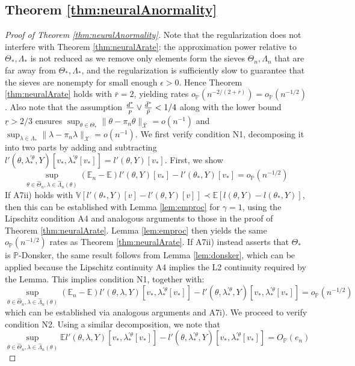 \documentclass[12pt]{article}
\theoremstyle{myplain}
\theoremstyle{definition}
\theoremstyle{definition}
\theoremstyle{remark}
\numberwithin{equation}{section}
\begin{document}
\subsection{Theorem \ref{thm:neuralAnormality}}
\begin{proof}[Proof of Theorem \ref{thm:neuralAnormality}]
Note that the regularization does not interfere with Theorem \ref{thm:neuralArate}: the approximation power relative to $\Theta_*, \Lambda_*$ is not reduced as we remove only elements form the sieves $\Theta_n, \Lambda_n$ that are far away from $\Theta_*, \Lambda_*$, and the regularization is sufficiently slow to guarantee that the sieves are nonempty for small enough $\epsilon>0$. Hence Theorem \ref{thm:neuralArate} holds with $\bar{r}=2$, yielding rates $o_\mathbb{P}(n^{-2/(2+\bar{r})})=o_\mathbb{P}(n^{-1/2})$. Also note that the assumption $\frac{d^*}{p}\vee\frac{\Bar{d}^*}{\Bar{p}}<1/4$ along with the lower bound $ \underline{r}>2/3$ ensures $\sup_{\theta\in\Theta_*}\|\theta-\pi_n\theta\|_{\bar{{\mathcal{X}}}}=o(n^{-1})$ and $\sup_{\lambda\in\Lambda_*}\|\lambda-\pi_n\lambda\|_{{\mathcal{X}}}=o(n^{-1})$. We first verify condition N1, decomposing it into two parts by adding and subtracting $l'(\theta,\lambda_*^{\prime\theta}, Y)[v_*,\lambda_*^{\prime\theta}[v_*]]=l'(\theta, Y)[v_*]$. First, we show
$$
\sup_{\theta\in\widehat{\Theta}_n,\lambda\in\widehat{\Lambda}_n(\theta)} (\mathbb{E}_n-\mathbb{E}) l'(\theta, Y)[v_*] - l'(\theta_*, Y)[v_*]  = o_\mathbb{P}(n^{-1/2})
$$
If A7ii) holds with $\mathbb{V}[l'(\theta_*, Y)[v] - l'(\theta, Y)[v]] \prec \mathbb{E}[l(\theta, Y)-l(\theta_*, Y)]$, then this can be established with Lemma \ref{lem:emproc} for $\gamma=1$, using the Lipschitz condition A4 and analogous arguments to those in the proof of Theorem \ref{thm:neuralArate}. Lemma \ref{lem:emproc} then yields the same $o_\mathbb{P}(n^{-1/2})$ rates as Theorem \ref{thm:neuralArate}. If A7ii) instead asserts that $\Theta_*$ is $\mathbb{P}$-Donsker, the same result follows from Lemma \ref{lem:donsker}, which can be applied because the Lipschitz continuity A4 implies the L2 continuity required by the Lemma. This implies condition N1, together with: 
$$
\sup_{\theta\in\widehat{\Theta}_n,\lambda\in\widehat{\Lambda}_n(\theta)} (\mathbb{E}_n-\mathbb{E}) l'(\theta,\lambda, Y)[v_*,\lambda_*^{\prime\theta}[v_*]]-l'(\theta,\lambda_*^{\prime\theta}, Y)[v_*,\lambda_*^{\prime\theta}[v_*]] = o_\mathbb{P}(n^{-1/2})
$$
which can be established via analogous arguments and A7i). We proceed to verify condition N2. Using a similar decomposition, we note that 
$$
\sup_{\theta\in\widehat{\Theta}_n,\lambda\in\widehat{\Lambda}_n(\theta)} \mathbb{E} l'(\theta,\lambda, Y)[v_*,\lambda_*^{\prime\theta}[v_*]]- l'(\theta,\lambda_*^{\prime\theta}, Y)[v_*,\lambda_*^{\prime\theta}[v_*]]  =  O_\mathbb{P}(e_n) 
$$
\end{proof}
\end{document}
